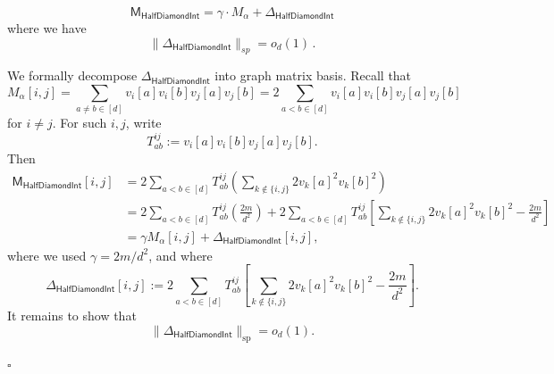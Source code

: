 \documentclass[10pt,a4paper]{amsart}
\def \al {\alpha}
\newcommand{\cm}{\mathsf{M} }
\newcommand{\gam}{\gamma}
\renewenvironment{proof}{{\emph{Proof.}  }}{\hfill$\square$ \vspace{8pt}}
\begin{document}
\begin{lemma}
	\[\cm_{\mathsf{HalfDiamondInt}} =\gam \cdot M_\al + \Delta_{\mathsf{HalfDiamondInt}} \]
where we have \[\|\Delta_{\mathsf{HalfDiamondInt}}\|_{sp} =o_d(1)\,.\]
\end{lemma}

\begin{proof}
	We formally decompose $\Delta_{\mathsf{HalfDiamondInt}} $ into graph matrix basis. Recall that
\[
    M_\alpha[i,j]
    =
    \sum_{a\neq b\in[d]}
    v_i[a]v_i[b]v_j[a]v_j[b]
    =
    2\sum_{a<b\in[d]}v_i[a]v_i[b]v_j[a]v_j[b]
\]
for \(i\neq j\). For such \(i,j\), write
\[
    T_{ab}^{ij}
    :=
    v_i[a]v_i[b]v_j[a]v_j[b].
\]
Then
\[
\begin{aligned}
    \cm_{\mathsf{HalfDiamondInt}}[i,j]
    &=
    2\sum_{a<b\in[d]} T_{ab}^{ij}
    \left(
        \sum_{k\notin\{i,j\}}2v_k[a]^2v_k[b]^2
    \right)                                                     \\
    &=
    2\sum_{a<b\in[d]} T_{ab}^{ij}
    \left(
        \frac{2m}{d^2}
    \right)
    +
    2\sum_{a<b\in[d]} T_{ab}^{ij}
    \left[
        \sum_{k\notin\{i,j\}}2v_k[a]^2v_k[b]^2
        -
        \frac{2m}{d^2}
    \right]                                                     \\
    &=
    \gamma M_\alpha[i,j]
    +
    \Delta_{\mathsf{HalfDiamondInt}}[i,j],
\end{aligned}
\]
where we used \(\gamma=2m/d^2\), and where
\[
    \Delta_{\mathsf{HalfDiamondInt}}[i,j]
    :=
    2\sum_{a<b\in[d]} T_{ab}^{ij}
    \left[
        \sum_{k\notin\{i,j\}}2v_k[a]^2v_k[b]^2
        -
        \frac{2m}{d^2}
    \right].
\]
It remains to show that
\[
    \|\Delta_{\mathsf{HalfDiamondInt}}\|_{\mathrm{sp}}
    =
    o_d(1).
\]


\end{proof}
\end{document}

